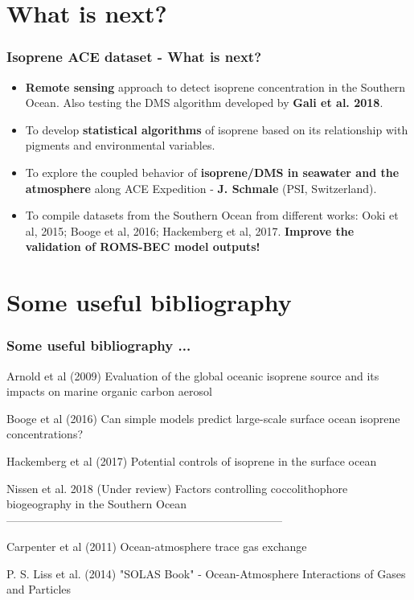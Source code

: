 \documentclass{beamer}
\begin{document}
\section{What is next?}

\begin{frame}
\frametitle{Isoprene ACE dataset - What is next?}

\begin{itemize}
\item \textbf{Remote sensing} approach to detect isoprene concentration in the Southern Ocean. Also testing the DMS algorithm developed by \textbf{Gali et al. 2018}.
\item To develop \textbf{statistical algorithms} of isoprene based on its relationship with pigments and environmental variables.
\item To explore the coupled behavior of\textbf{ isoprene/DMS in seawater and the atmosphere} along ACE Expedition -\textbf{ J. Schmale} (PSI, Switzerland).
\item To compile datasets from the Southern Ocean from different works: Ooki et al, 2015; Booge et al, 2016; Hackemberg et al, 2017. \textbf{Improve the validation of ROMS-BEC model outputs!}
\end{itemize}
\end{frame}
\section{Some useful bibliography}
\begin{frame}
\frametitle{Some useful bibliography ...}
\footnotesize{
\begin{thebibliography}{99} %
 
 Arnold et al (2009)
\newblock Evaluation of the global oceanic isoprene source and its impacts on marine organic carbon aerosol

 Booge et al (2016)
\newblock Can simple models predict large-scale surface ocean isoprene concentrations?

 Hackemberg et al (2017)
\newblock Potential controls of isoprene in the surface ocean

 Nissen et al. 2018 (Under review)
\newblock Factors controlling coccolithophore biogeography in the Southern Ocean\\

--------------------------------------------------------------------------

 Carpenter et al (2011)
\newblock Ocean-atmosphere trace gas exchange

 P. S. Liss et al. (2014)
\newblock  "SOLAS Book" - Ocean-Atmosphere Interactions of Gases and Particles

\end{thebibliography}
}
\end{frame}
\end{document}
